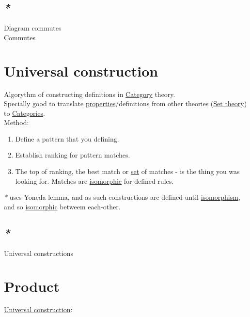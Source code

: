 \documentclass[a4paper,14pt,oneside]{book}
\begin{document}
\subsection{\emph{*}}
\label{sec:orgaad382a}

\label{orgdbd11f4}Diagram commutes\\
\label{org2de67a0}Commutes\\

\section{\label{org11d164b}Universal construction}
\label{sec:org006533f}
Algorythm of constructing definitions in \hyperref[org841d8bc]{Category} theory.\\
Specially good to translate \hyperref[org1feb373]{properties}/definitions from other theories (\hyperref[orgc58b261]{Set theory}) to \hyperref[org0c8f0eb]{Categories}.\\

Method:\\
\begin{enumerate}
\item Define a pattern that you defining.\\
\item Establish ranking for pattern matches.\\
\item The top of ranking, the best match or \hyperref[orge119629]{set} of matches - is the thing you was looking for. Matches are \hyperref[org54fb9c2]{isomorphic} for defined rules.\\
\end{enumerate}

\emph{*} uses Yoneda lemma, and as such constructions are defined until \hyperref[org1fa9882]{isomorphism}, and so \hyperref[org54fb9c2]{isomorphic} betweem each-other.\\

\subsection{\emph{*}}
\label{sec:org3382fb2}

\label{orgafdc7a0}Universal constructions\\

\section{\label{org7331b6a}Product}
\label{sec:org8c062da}
\hyperref[org11d164b]{Universal construction}:\\
\end{document}
